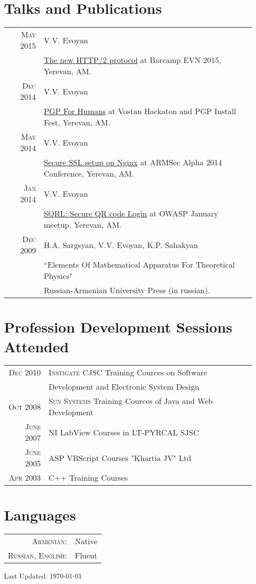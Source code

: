 \documentclass[a4paper,10pt]{article}
\begin{document}
\section{Talks and Publications}
\begin{tabular}{rl}
  \textsc{May} 2015
    & V.V. Evoyan \\
    & \href{https://evoyan.org/http2-barcamp/}{The new HTTP/2 protocol}
      at Barcamp EVN 2015, Yerevan, AM. \\
  \textsc{Dec} 2014
    & V.V. Evoyan \\
    & \href{https://evoyan.org/pgp-for-humans/}{PGP For Humans}
      at Vostan Hackaton and PGP Install Fest, Yerevan, AM. \\
  \textsc{May} 2014
    & V.V. Evoyan \\ &
    \href{http://vahe-evoyan.github.io/nginxssl-presentation/}
         {Secure SSL setup on Nginx} at ARMSec Alpha 2014 Conference,
         Yerevan, AM. \\
  \textsc{Jan} 2014
    & V.V. Evoyan \\
    & \href{https://prezi.com/qpgpm6zuxirv/sqrl}{SQRL: Secure QR code Login}
      at OWASP January meetup, Yerevan, AM. \\
  \textsc{Dec} 2009
    & H.A. Sargsyan, V.V. Evoyan, K.P. Sahakyan \\
    & ``Elements Of Mathematical Apparatus For Theoretical Physics" \\
    & Russian-Armenian University Press (in russian).
\end{tabular}


\section{Profession Development Sessions Attended}
\begin{tabular}{rl}
  \textsc{Dec} 2010
    & \textsc{Instigate CJSC} Training Cources on Software \\
    & Development and Electronic System Design \\
  \textsc{Oct} 2008
    & \textsc{Sun Systems} Training Cources of Java and Web Development \\
  \textsc{June} 2007
    & NI LabView Courses in LT-PYRCAL SJSC \\
  \textsc{June} 2005
    & ASP VBScript Courses "Khartia JV" Ltd \\
  \textsc{Apr} 2003
    & C++ Training Courses
\end{tabular}


\section{Languages}
\begin{tabular}{rl}
  \textsc{Armenian:}         & Native \\
  \textsc{Russian, English:} & Fluent \\
\end{tabular}


\vfill
\hfill \footnotesize{Last Updated: \mydate\today }
\end{document}
